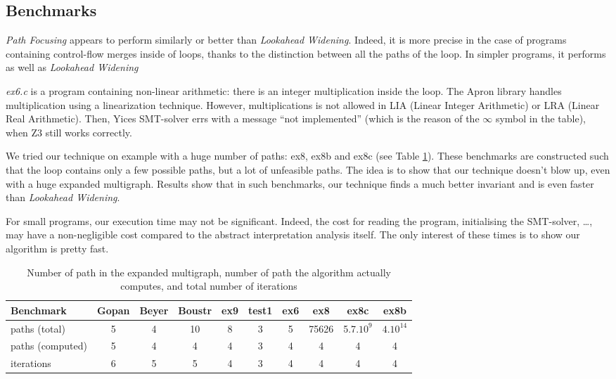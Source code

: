 \documentclass[a4paper,english,titlepage,11pt]{report}
\begin{document}
	\subsection{Benchmarks}

\emph{Path Focusing} appears to perform similarly or better than 
\emph{Lookahead Widening}. Indeed, it is more precise in the case of programs
containing control-flow merges inside of loops, thanks to the distinction
between all the paths of the loop. In simpler programs, it performs as well as
\emph{Lookahead Widening}

\emph{ex6.c} is a program containing non-linear arithmetic: there is an integer
multiplication inside the loop. The Apron library handles multiplication using
a linearization technique. However, multiplications is not allowed in LIA
(Linear Integer Arithmetic) or LRA (Linear Real Arithmetic). Then, Yices
SMT-solver errs with a message ``not implemented'' (which is the reason of the
$\infty$ symbol in the table), when Z3 still works correctly.

We tried our technique on example with a huge number of paths: ex8, ex8b and
ex8c (see Table \ref{npaths}). These benchmarks are constructed such that the
loop contains only a few
possible paths, but a lot of unfeasible paths. The idea is to show that our
technique doesn't blow up, even with a huge expanded multigraph. Results show
that in such benchmarks, our technique finds a much better invariant and is even
faster than \emph{Lookahead Widening}.

For small programs, our execution time may not be significant. Indeed, the cost
for reading the program, initialising the SMT-solver, \dots, may have a
	non-negligible cost compared to the abstract interpretation analysis itself.
	The only interest of these times is to show our algorithm is pretty fast.

\begin{table}[!h]
\begin{tabular}{|l||c|c|c|c|c|c|c|c|c|} \hline
Benchmark  & Gopan & Beyer & Boustr & ex9 & test1 & ex6 & ex8 &
ex8c & ex8b\\ \hline \hline
paths (total) & 5 & 4 & 10 & 8 & 3 & 5 & 75626 & 5.7$.10^9$ & $4.10^{14}$\\
\hline
paths (computed) & 5 & 4 & 4 & 4 & 3 & 4 & 4 & 4 & 4\\ \hline
iterations  & 6 & 5 & 5 & 4 & 3 & 4 & 4 & 4 & 4\\ \hline
\end{tabular}
\caption{Number of path in the expanded multigraph, number of path the
algorithm actually computes, and total number of iterations}
\label{npaths}
\end{table}
\end{document}
